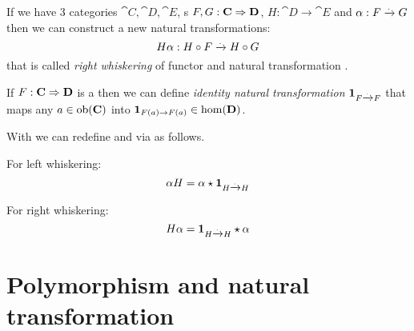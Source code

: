 
\begin{definition}
\label{def:rw}
If we have 3 categories $\cat{C}, \cat{D}, \cat{E}$, 
s $F,G: \mathbf{C} \Rightarrow \mathbf{D}$, $H: \cat{D} \to
\cat{E}$ and  
$\alpha: F \xrightarrow{.} G$ then we can construct a new natural 
transformations: 
\[
H \alpha : H \circ F \xrightarrow{.} H \circ G
\]
that is called \textit{right whiskering} of functor and natural
transformation \cite{nlab:whiskering}. 
\end{definition}

\begin{definition}
\label{def:idnt}
If $F: \mathbf{C} \Rightarrow \mathbf{D}$ is a  then we can
define \textit{identity natural transformation}
$\mathbf{1}_{ F \xrightarrow{.} F }$ that maps any  
$a \in \mathrm{ob}(\mathbf{C})$ into  $\mathbf{1}_{ F(a) \to F(a) } \in \mathrm{hom}(\mathbf{D})$.
\end{definition}

\begin{remark}[Whiskering]
\label{rem:whiskering}
With  we can redefine  and
 via  as follows.

For left whiskering:
\begin{equation}
\label{eq:lw}
\alpha H = \alpha \star \mathbf{1}_{ H \xrightarrow{.} H }
\end{equation}

For right whiskering:
\begin{equation}
\label{eq:rw}
H \alpha = \mathbf{1}_{ H \xrightarrow{.} H } \star \alpha
\end{equation}
\end{remark}


\section{Polymorphism and natural transformation}

